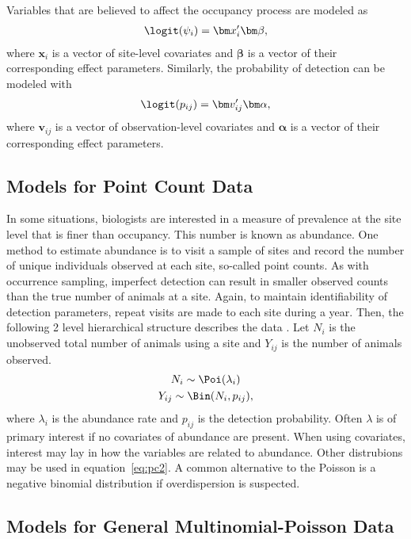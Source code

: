 Variables that are believed to affect the occupancy process are
modeled as
\begin{gather}
  \logit(\psi_i) = \bm x_i' \bm \beta,
\end{gather}
where $\bm x_i$ is a vector of site-level covariates and $\bm \beta$
is a vector of their corresponding effect parameters.  Similarly, the
probability of detection can be modeled with
\begin{gather}
  \logit(p_{ij}) = \bm v_{ij}' \bm \alpha,
\end{gather}
where $\bm v_{ij}$ is a vector of observation-level covariates and
$\bm \alpha$ is a vector of their corresponding effect parameters.



\subsection{Models for Point Count Data}

In some situations, biologists are interested in a measure of
prevalence at the site level that is finer than occupancy.  This
number is known as abundance.  One method to estimate abundance
is to visit a sample of sites and record the number of unique
individuals observed at each site, so-called point counts.  As with occurrence sampling,
imperfect detection can result in smaller observed counts than the
true number of animals at a site.  Again, to maintain identifiability
of detection parameters, repeat visits are made to each site during a
year.  Then, the following 2 level hierarchical structure describes
the data \citep{royle_n-mixture_2004}.  Let $N_i$ is the unobserved
total number of animals using a site and $Y_{ij}$ is the number of
animals observed.
\begin{gather}
  N_i \sim \Poi(\lambda_i) \label{eq:pc2} \\
  Y_{ij} \sim \Bin(N_i, p_{ij}),
\end{gather}
where $\lambda_i$ is the abundance rate and $p_{ij}$ is the detection probability.
Often $\lambda$ is of primary interest if no covariates of abundance are present.
When using covariates, interest may lay in how the variables are related to
abundance.  Other distrubions may be used in equation~\ref{eq:pc2}.  A common
alternative to the Poisson is a negative binomial distribution if overdispersion is
suspected.

\subsection{Models for General Multinomial-Poisson Data}

